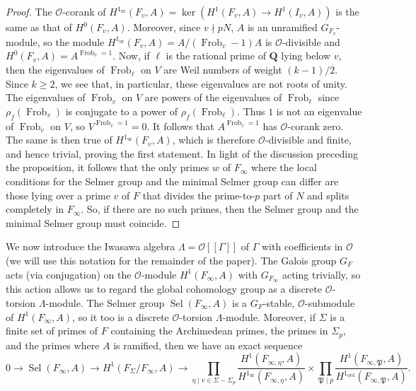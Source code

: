 \documentclass[12 pt]{amsart}
\theoremstyle{plain}
\theoremstyle{definition}
\numberwithin{equation}{section}
\numberwithin{table}{section}
\begin{document}
\begin{proof}
The $\mathscr{O}$-corank of $H^1_\operatorname{ur}(F_v,A)=\ker(H^1(F_v,A)\rightarrow H^1(I_v,A))$ is the same as that of $H^0(F_v,A)$. Moreover, since $v\nmid pN$, $A$ is an unramified $G_{F_v}$-module, so the module $H^1_\operatorname{ur}(F_v,A)=A/(\operatorname{Frob}_v-1)A$ is $\mathscr{O}$-divisible and $H^0(F_v,A)=A^{\operatorname{Frob}_v=1}$. Now, if $\ell$ is the rational prime of $\mathbf{Q}$ lying below $v$, then the eigenvalues of $\operatorname{Frob}_\ell$ on $V$ are Weil numbers of weight $(k-1)/2$. Since $k\geq 2$, we see that, in particular, these eigenvalues are not roots of unity. The eigenvalues of $\operatorname{Frob}_v$ on $V$ are powers of the eigenvalues of $\operatorname{Frob}_\ell$ since $\rho_f(\operatorname{Frob}_v)$ is conjugate to a power of $\rho_f(\operatorname{Frob}_\ell)$. Thus $1$ is not an eigenvalue of $\operatorname{Frob}_v$ on $V$, so $V^{\operatorname{Frob}_v=1}=0$. It follows that $A^{\operatorname{Frob}_v=1}$ has $\mathscr{O}$-corank zero. The same is then true of $H^1_\operatorname{ur}(F_v,A)$, which is therefore $\mathscr{O}$-divisible and finite, and hence trivial, proving the first statement. In light of the discussion preceding the proposition, it follows that the only primes $w$ of $F_\infty$ where the local conditions for the Selmer group and the minimal Selmer group can differ are those lying over a prime $v$ of $F$ that divides the prime-to-$p$ part of $N$ and splits completely in $F_\infty$. So, if there are no such primes, then the Selmer group and the minimal Selmer group must coincide.
\end{proof}
\indent We now introduce the Iwasawa algebra $\Lambda=\mathscr{O}[[\Gamma]]$ of $\Gamma$ with coefficients in $\mathscr{O}$ (we will use this notation for the remainder of the paper). The Galois group $G_F$ acts (via conjugation) on the $\mathscr{O}$-module $H^1(F_\infty,A)$ with $G_{F_\infty}$ acting trivially, so this action allows us to regard the global cohomology group as a discrete $\mathscr{O}$-torsion $\Lambda$-module. The Selmer group $\operatorname{Sel}(F_\infty,A)$ is a $G_F$-stable, $\mathscr{O}$-submodule of $H^1(F_\infty,A)$, so it too is a discrete $\mathscr{O}$-torsion $\Lambda$-module. Moreover, if $\Sigma$ is a finite set of primes of $F$ containing the Archimedean primes, the primes in $\Sigma_p$, and the primes where $A$ is ramified, then we have an exact sequence
\begin{equation}
\label{sl}
0\rightarrow \operatorname{Sel}(F_\infty,A)\rightarrow H^1(F_\Sigma/F_\infty,A)\rightarrow\prod_{\eta\mid v\in\Sigma-\Sigma_p}\dfrac{H^1(F_{\infty,\eta},A)}{H^1_\operatorname{ur}(F_{\infty,\eta},A)}\times\prod_{\mathfrak{P}\mid p}\dfrac{H^1(F_{\infty,\mathfrak{P}},A)}{H^1_\operatorname{ord}(F_{\infty,\mathfrak{P}},A)}\text{.}
\end{equation}
\end{document}
